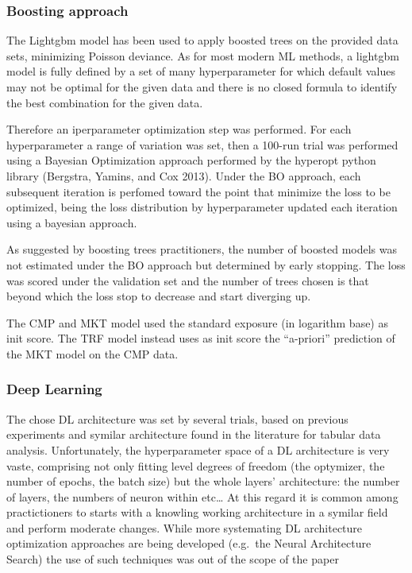\documentclass[
]{article}
\begin{document}
\hypertarget{boosting-approach}{%
\subsubsection{Boosting approach}\label{boosting-approach}}

The Lightgbm model has been used to apply boosted trees on the provided
data sets, minimizing Poisson deviance. As for most modern ML methods, a
lightgbm model is fully defined by a set of many hyperparameter for
which default values may not be optimal for the given data and there is
no closed formula to identify the best combination for the given data.

Therefore an iperparameter optimization step was performed. For each
hyperparameter a range of variation was set, then a 100-run trial was
performed using a Bayesian Optimization approach performed by the
hyperopt python library (Bergstra, Yamins, and Cox 2013). Under the BO
approach, each subsequent iteration is perfomed toward the point that
minimize the loss to be optimized, being the loss distribution by
hyperparameter updated each iteration using a bayesian approach.

As suggested by boosting trees practitioners, the number of boosted
models was not estimated under the BO approach but determined by early
stopping. The loss was scored under the validation set and the number of
trees chosen is that beyond which the loss stop to decrease and start
diverging up.

The CMP and MKT model used the standard exposure (in logarithm base) as
init score. The TRF model instead uses as init score the ``a-priori''
prediction of the MKT model on the CMP data.

\hypertarget{deep-learning-1}{%
\subsubsection{Deep Learning}\label{deep-learning-1}}

The chose DL architecture was set by several trials, based on previous
experiments and symilar architecture found in the literature for tabular
data analysis. Unfortunately, the hyperparameter space of a DL
architecture is very vaste, comprising not only fitting level degrees of
freedom (the optymizer, the number of epochs, the batch size) but the
whole layers' architecture: the number of layers, the numbers of neuron
within etc\ldots{} At this regard it is common among practictioners to
starts with a knowling working architecture in a symilar field and
perform moderate changes. While more systemating DL architecture
optimization approaches are being developed (e.g.~the Neural
Architecture Search) the use of such techniques was out of the scope of
the paper
\end{document}
